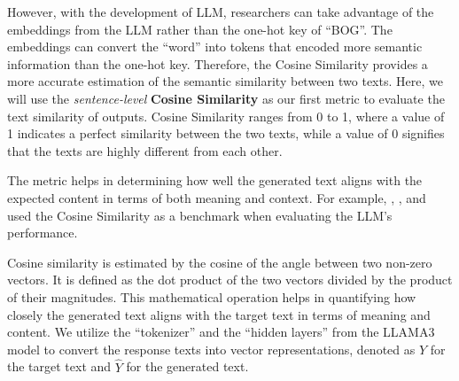 However, with the development of LLM, researchers can take advantage of the embeddings from the LLM rather than the one-hot key of ``BOG''. The embeddings can convert the ``word'' into tokens that encoded more semantic information than the one-hot key. Therefore, the Cosine Similarity provides a more accurate estimation of the semantic similarity between two texts. Here, we will use the \textit{sentence-level} \textbf{Cosine Similarity} as our first metric to evaluate the text similarity of outputs. Cosine Similarity ranges from 0 to 1, where a value of 1 indicates a perfect similarity between the two texts, while a value of 0 signifies that the texts are highly different from each other.

The metric helps in determining how well the generated text aligns with the expected content in terms of both meaning and context. For example, \cite{aynetdinov2024semscore}, \cite{kim2024comparison}, and \cite{yauney2023data} used the Cosine Similarity as a benchmark when evaluating the LLM's performance.

Cosine similarity is estimated by the cosine of the angle between two non-zero vectors. It is defined as the dot product of the two vectors divided by the product of their magnitudes. This mathematical operation helps in quantifying how closely the generated text aligns with the target text in terms of meaning and content. We utilize the ``tokenizer'' and the ``hidden layers'' from the LLAMA3 model to convert the response texts into vector representations, denoted as $Y$ for the target text and $\hat{Y}$ for the generated text.










